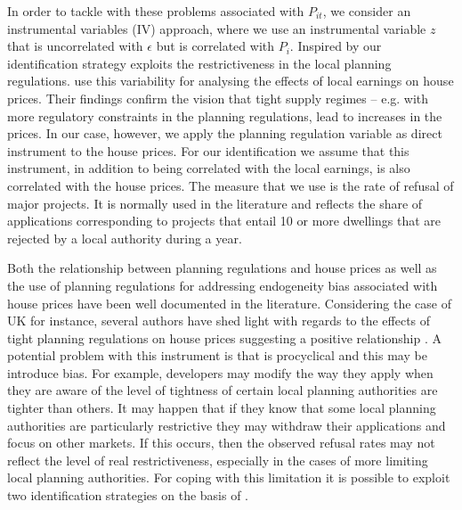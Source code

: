 \documentclass[12pt,letterpaper]{article}
\begin{document}
     In order to tackle with these problems associated with $P_{it}$, we consider an instrumental variables (IV) approach, 
     where we use an instrumental variable $z$  that is uncorrelated with $\epsilon$ but is correlated
       with $P_{i}$. Inspired by \citet{hilber2016supply} our identification 
       strategy exploits the restrictiveness in the local planning regulations. 
       \citet{hilber2016supply} use this variability for analysing the effects of local earnings
 on house prices. Their findings confirm the vision that tight supply regimes – e.g. with more regulatory 
 constraints in the planning regulations, lead to increases in the prices. In our case, however, we apply 
the planning regulation variable as direct instrument to the house prices. For our identification we assume that this instrument,
  in addition to being correlated with the local earnings, is also correlated with the house prices. The measure that we use is the 
 rate of refusal of major projects. It is normally used in the literature and 
 reflects the share of applications corresponding to projects that entail 10 or more 
 dwellings that are rejected by a local authority during a year.  
 
 Both the relationship between
  planning regulations and house prices as well as the use of planning regulations 
  for addressing endogeneity bias associated with house prices have been well documented in the literature. 
  Considering the case of UK for instance, several authors have shed light with regards to the effects of tight planning 
  regulations on house prices suggesting a positive relationship \citep{cheshire2009, cheshire2014, barker2004barker, hilber2016supply}.
  A potential problem with this instrument is that is procyclical and this may 
be introduce bias. For example, developers may modify the way they apply when they are aware of the level
 of tightness of certain local planning authorities are tighter than others. It may happen that if they know
  that some local planning authorities are particularly restrictive they may withdraw their applications and focus
   on other markets. If this occurs, then the observed refusal rates may not reflect the level of real 
   restrictiveness, especially in the cases of more limiting local planning authorities. 
 For coping with this limitation it is possible to exploit two identification strategies on the basis of \citet{hilber2016supply}.
    
\end{document}
